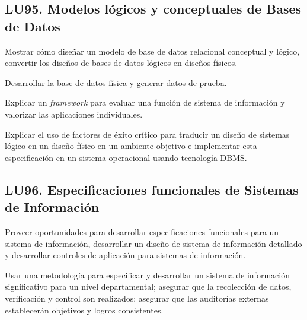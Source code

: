 \subsection{LU95. Modelos lógicos y conceptuales de Bases de Datos}\label{sec:BOK-LU95}\label{sec:LU95}
\begin{LearningUnit}
\begin{LUGoal}
\item Mostrar cómo diseñar un modelo de base de datos relacional conceptual y lógico, convertir los diseños de bases de datos lógicos en diseños físicos.
\end{LUGoal}

\begin{LUObjective}
\item Desarrollar la base de datos física y generar datos de prueba.
\item Explicar un \textit{framework} para evaluar una función de sistema de información y valorizar las aplicaciones individuales.
\item Explicar el uso de factores de éxito crítico para traducir un diseño de sistemas lógico en un diseño físico en un ambiente objetivo e implementar esta especificación en un sistema operacional usando tecnología DBMS.
\end{LUObjective}
\end{LearningUnit}

\subsection{LU96. Especificaciones funcionales de Sistemas de Información}\label{sec:BOK-LU96}\label{sec:LU96}
\begin{LearningUnit}
\begin{LUGoal}
\item Proveer oportunidades para desarrollar especificaciones funcionales para un sistema de información, desarrollar un diseño de sistema de información detallado y desarrollar controles de aplicación para sistemas de información.
\end{LUGoal}

\begin{LUObjective}
\item Usar una metodología para especificar y desarrollar un sistema de información significativo para un nivel departamental; asegurar que la recolección de datos, verificación y control son realizados; asegurar que las auditorías externas establecerán objetivos y logros consistentes.
\end{LUObjective}
\end{LearningUnit}

